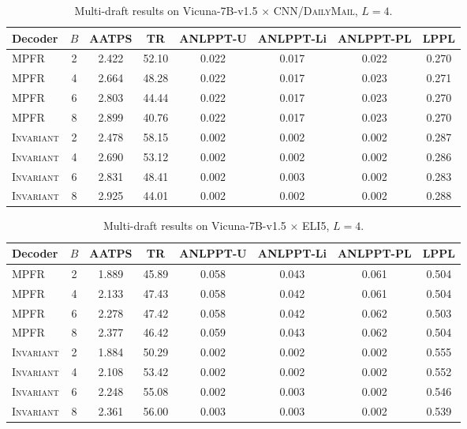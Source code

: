 \begin{table}[h]
\centering
\small
\caption{Multi-draft results on Vicuna-7B-v1.5 $\times$
\textsc{CNN/DailyMail}, $L{=}4$.}
\label{tab:full-vicuna-cnn}
\begin{tabular}{l c c c c c c c}
\toprule
Decoder & $B$ & AATPS & TR & ANLPPT-U & ANLPPT-Li & ANLPPT-PL & LPPL \\
\midrule
\textsc{MPFR}      & 2 & 2.422 & 52.10 & 0.022 & 0.017 & 0.022 & 0.270 \\
\textsc{MPFR}      & 4 & 2.664 & 48.28 & 0.022 & 0.017 & 0.023 & 0.271 \\
\textsc{MPFR}      & 6 & 2.803 & 44.44 & 0.022 & 0.017 & 0.023 & 0.270 \\
\textsc{MPFR}      & 8 & 2.899 & 40.76 & 0.022 & 0.017 & 0.023 & 0.270 \\
\textsc{Invariant} & 2 & 2.478 & 58.15 & 0.002 & 0.002 & 0.002 & 0.287 \\
\textsc{Invariant} & 4 & 2.690 & 53.12 & 0.002 & 0.002 & 0.002 & 0.286 \\
\textsc{Invariant} & 6 & 2.831 & 48.41 & 0.002 & 0.003 & 0.002 & 0.283 \\
\textsc{Invariant} & 8 & 2.925 & 44.01 & 0.002 & 0.002 & 0.002 & 0.288 \\
\bottomrule
\end{tabular}
\end{table}

\begin{table}[!htbp]
\centering
\small
\caption{Multi-draft results on Vicuna-7B-v1.5 $\times$ \textsc{ELI5},
$L{=}4$.}
\label{tab:full-vicuna-eli5}
\begin{tabular}{l c c c c c c c}
\toprule
Decoder & $B$ & AATPS & TR & ANLPPT-U & ANLPPT-Li & ANLPPT-PL & LPPL \\
\midrule
\textsc{MPFR}      & 2 & 1.889 & 45.89 & 0.058 & 0.043 & 0.061 & 0.504 \\
\textsc{MPFR}      & 4 & 2.133 & 47.43 & 0.058 & 0.042 & 0.061 & 0.504 \\
\textsc{MPFR}      & 6 & 2.278 & 47.42 & 0.058 & 0.042 & 0.062 & 0.503 \\
\textsc{MPFR}      & 8 & 2.377 & 46.42 & 0.059 & 0.043 & 0.062 & 0.504 \\
\textsc{Invariant} & 2 & 1.884 & 50.29 & 0.002 & 0.002 & 0.002 & 0.555 \\
\textsc{Invariant} & 4 & 2.108 & 53.42 & 0.002 & 0.002 & 0.002 & 0.552 \\
\textsc{Invariant} & 6 & 2.248 & 55.08 & 0.002 & 0.003 & 0.002 & 0.546 \\
\textsc{Invariant} & 8 & 2.361 & 56.00 & 0.003 & 0.003 & 0.002 & 0.539 \\
\bottomrule
\end{tabular}
\end{table}

